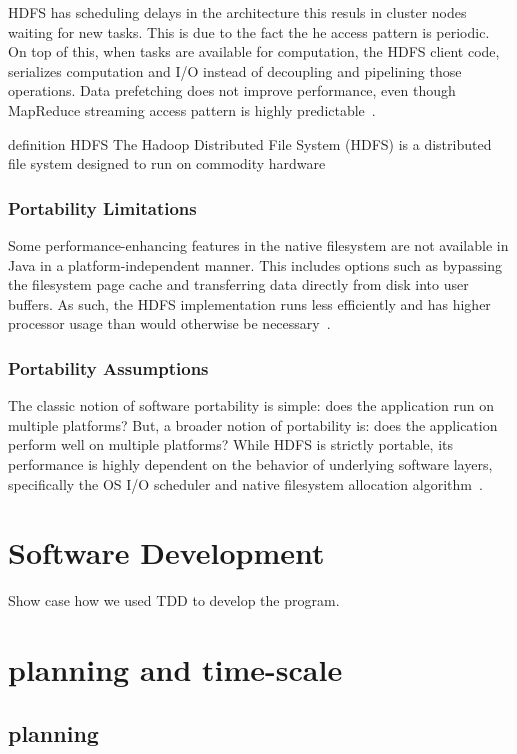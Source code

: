 \documentclass{report}
\begin{document}
HDFS has scheduling delays in the architecture this resuls in cluster nodes waiting for new tasks. This is due to the fact the he access pattern is periodic. On top of this, when tasks are available for computation, the HDFS client code, serializes computation and I/O instead of decoupling and pipelining those operations. Data prefetching does not improve performance, even though MapReduce streaming access pattern is highly predictable~\cite{shafer_hadoop_2010}.

definition HDFS The Hadoop Distributed File System (HDFS) is a distributed file system designed to run on commodity hardware

\subsubsection{Portability Limitations}
Some performance-enhancing features in the native filesystem are not available in Java in a platform-independent manner. This includes options such as bypassing the filesystem page cache and transferring data directly from disk into user buffers. As such, the HDFS implementation runs less efficiently and has higher processor usage than would otherwise be necessary~\cite{shafer_hadoop_2010}.

\subsubsection{Portability Assumptions}
The classic notion of software portability is simple: does the application run on multiple platforms? But, a broader notion of portability is: does the application perform well on multiple platforms? While HDFS is strictly portable, its performance is highly dependent on the behavior of underlying software layers, specifically the OS I/O scheduler and native filesystem allocation algorithm~\cite{shafer_hadoop_2010}.

\section{Software Development}

Show case how we used TDD to develop the program.

\section{planning and time-scale}
\subsection{planning}
\end{document}
